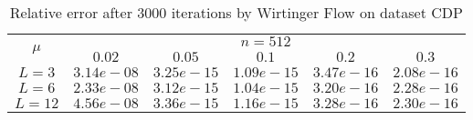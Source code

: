 \begin{table}\label{gaussian}
\centering
\begin{tabular}{|c|c|c|c|c|c|}

\hline
\multirow{2}{*}{ $\mu$} &\multicolumn{5}{c|}{$n = 512 $}\\\cline{2-6}
 &$0.02$ &$0.05$ &$0.1$ &$0.2$ &$0.3$\\\hline
$L=3$ & $3.14e-08$ & $3.25e-15$ & $1.09e-15$ & $3.47e-16$ & $2.08e-16$\\\hline
$L=6$ & $2.33e-08$ & $3.12e-15$ & $1.04e-15$ & $3.20e-16$ & $2.28e-16$\\\hline
$L=12$ & $4.56e-08$ & $3.36e-15$ & $1.16e-15$ & $3.28e-16$ & $2.30e-16$\\\hline
\end{tabular}
\caption{Relative error after $3000$ iterations by Wirtinger Flow on dataset CDP}
\end{table}
